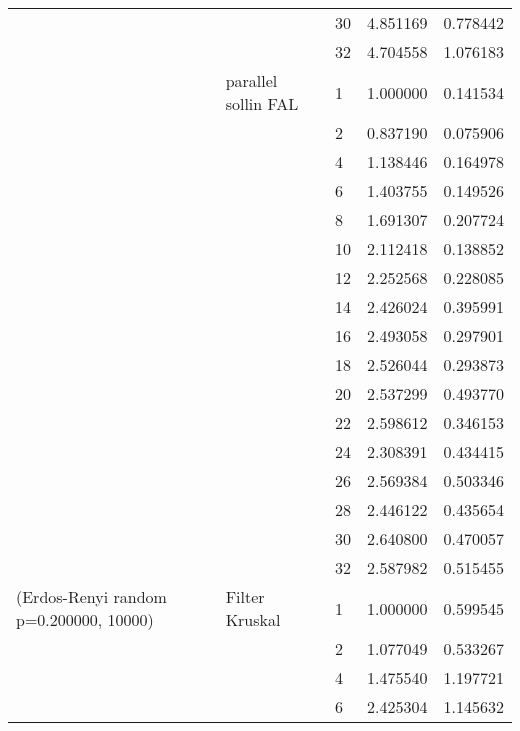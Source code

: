 \begin{tabular}{lllrr}
                      &                     & 30 &  4.851169 &  0.778442 \\
                      &                     & 32 &  4.704558 &  1.076183 \\
                      & parallel sollin FAL & 1  &  1.000000 &  0.141534 \\
                      &                     & 2  &  0.837190 &  0.075906 \\
                      &                     & 4  &  1.138446 &  0.164978 \\
                      &                     & 6  &  1.403755 &  0.149526 \\
                      &                     & 8  &  1.691307 &  0.207724 \\
                      &                     & 10 &  2.112418 &  0.138852 \\
                      &                     & 12 &  2.252568 &  0.228085 \\
                      &                     & 14 &  2.426024 &  0.395991 \\
                      &                     & 16 &  2.493058 &  0.297901 \\
                      &                     & 18 &  2.526044 &  0.293873 \\
                      &                     & 20 &  2.537299 &  0.493770 \\
                      &                     & 22 &  2.598612 &  0.346153 \\
                      &                     & 24 &  2.308391 &  0.434415 \\
                      &                     & 26 &  2.569384 &  0.503346 \\
                      &                     & 28 &  2.446122 &  0.435654 \\
                      &                     & 30 &  2.640800 &  0.470057 \\
                      &                     & 32 &  2.587982 &  0.515455 \\
(Erdos-Renyi random p=0.200000, 10000) & Filter Kruskal & 1  &  1.000000 &  0.599545 \\
                      &                     & 2  &  1.077049 &  0.533267 \\
                      &                     & 4  &  1.475540 &  1.197721 \\
                      &                     & 6  &  2.425304 &  1.145632 \\

\end{tabular}
